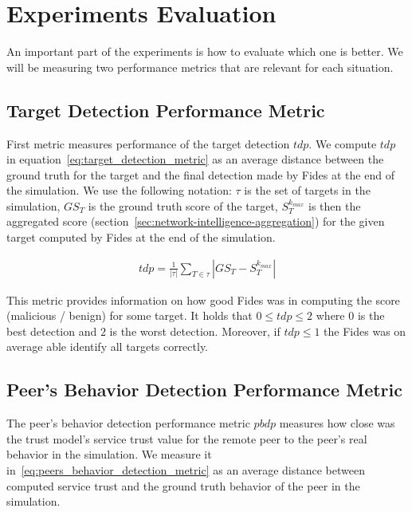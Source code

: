 \section{Experiments Evaluation}
\label{sec:experiments-evaluation}

An important part of the experiments is how to evaluate which one is better. We will be measuring two performance metrics that are relevant for each situation.

\subsection{Target Detection Performance Metric}
\label{subsec:target-detection-performance-metric}
First metric measures performance of the target detection $tdp$.
We compute $tdp$ in equation~\ref{eq:target_detection_metric} as an average distance between the ground truth for the target and the final detection made by Fides at the end of the simulation.
We use the following notation: $\tau$ is the set of targets in the simulation, $GS_{T}$ is the ground truth score of the target, $S^{k_{max}}_{T}$ is then the aggregated score (section~\ref{sec:network-intelligence-aggregation}) for the given target computed by Fides at the end of the simulation.

\begin{equation}
\begin{split}
    tdp = \frac{1}{|\tau|} \sum_{T \in \tau}\left|GS_{T} - S^{k_{max}}_{T} \right|
\end{split}
\label{eq:target_detection_metric}
\end{equation}

\noindent
This metric provides information on how good Fides was in computing the score (malicious / benign) for some target.
It holds that $0 \leq tdp \leq 2$ where $0$ is the best detection and $2$ is the worst detection.
Moreover, if $tdp \le 1$ the Fides was on average able identify all targets correctly.

\subsection{Peer's Behavior Detection Performance Metric}
\label{subsec:peers-behavior-detection-performance-metric}

The peer's behavior detection performance metric $pbdp$ measures how close was the trust model's service trust value for the remote peer to the peer's real behavior in the simulation.
We measure it in~\ref{eq:peers_behavior_detection_metric} as an average distance between computed service trust and the ground truth behavior of the peer in the simulation.

